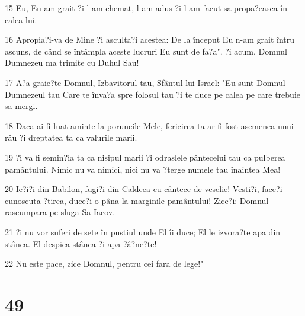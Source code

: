 \par 15 Eu, Eu am grait ?i l-am chemat, l-am adus ?i l-am facut sa propa?easca în calea lui.
\par 16 Apropia?i-va de Mine ?i asculta?i acestea: De la început Eu n-am grait întru ascuns, de când se întâmpla aceste lucruri Eu sunt de fa?a". ?i acum, Domnul Dumnezeu ma trimite cu Duhul Sau!
\par 17 A?a graie?te Domnul, Izbavitorul tau, Sfântul lui Israel: "Eu sunt Domnul Dumnezeul tau Care te înva?a spre folosul tau ?i te duce pe calea pe care trebuie sa mergi.
\par 18 Daca ai fi luat aminte la poruncile Mele, fericirea ta ar fi fost asemenea unui râu ?i dreptatea ta ca valurile marii.
\par 19 ?i va fi semin?ia ta ca nisipul marii ?i odraslele pântecelui tau ca pulberea pamântului. Nimic nu va nimici, nici nu va ?terge numele tau înaintea Mea!
\par 20 Ie?i?i din Babilon, fugi?i din Caldeea cu cântece de veselie! Vesti?i, face?i cunoscuta ?tirea, duce?i-o pâna la marginile pamântului! Zice?i: Domnul rascumpara pe sluga Sa Iacov.
\par 21 ?i nu vor suferi de sete în pustiul unde El îi duce; El le izvora?te apa din stânca. El despica stânca ?i apa ?â?ne?te!
\par 22 Nu este pace, zice Domnul, pentru cei fara de lege!"

\chapter{49}

